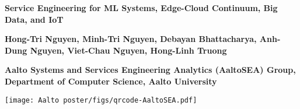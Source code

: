 \documentclass[landscape,a0,final]{a0poster} %
\begin{document}
\thispagestyle{empty} %


\begin{minipage}[t]{0.98\linewidth} %
\vspace{0pt} %

\vspace{0.008\linewidth} %

\begin{minipage}[t]{0.09\linewidth} %
\vspace{0pt} %


\end{minipage} %
\begin{minipage}[t]{0.72\linewidth} %
\vspace{0pt} %


{\renewcommand{\baselinestretch}{0.85} %
\Huge{\bfseries{\textsf{Service Engineering for ML Systems, Edge-Cloud Continuum, Big Data, and IoT}}} %
\par} %
\vspace{0.01\linewidth} %

\normalsize{\textsf{\bfseries{Hong-Tri Nguyen, Minh-Tri Nguyen, Debayan Bhattacharya, Anh-Dung Nguyen, Viet-Chau Nguyen, Hong-Linh Truong}}} %

\textcolor{aaltoGray}{\textsf{\bfseries{Aalto Systems and Services Engineering Analytics (AaltoSEA) Group, Department of Computer Science, Aalto University}}}
%
\end{minipage}
\begin{minipage}[t]{0.35\linewidth}
\vspace{-10pt} %

\vspace{0.008\linewidth} %
\texttt{[image: Aalto poster/figs/qrcode-AaltoSEA.pdf]}
\end{minipage}
\end{minipage}
\end{document}
